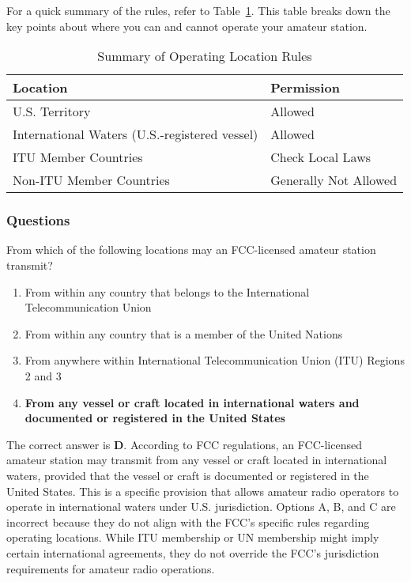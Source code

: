 For a quick summary of the rules, refer to Table~\ref{tab:operating-location-summary}. This table breaks down the key points about where you can and cannot operate your amateur station.

\begin{table}[h]
    \centering
    \begin{tabular}{|l|l|}
        \hline
        \textbf{Location} & \textbf{Permission} \\
        \hline
        U.S. Territory & Allowed \\
        International Waters (U.S.-registered vessel) & Allowed \\
        ITU Member Countries & Check Local Laws \\
        Non-ITU Member Countries & Generally Not Allowed \\
        \hline
    \end{tabular}
    \caption{Summary of Operating Location Rules}
    \label{tab:operating-location-summary}
\end{table}

\subsubsection*{Questions}

\begin{tcolorbox}[colback=gray!10!white,colframe=black!75!black,title={T1C06}]
    From which of the following locations may an FCC-licensed amateur station transmit?
    \begin{enumerate}[label=\Alph*),noitemsep]
        \item From within any country that belongs to the International Telecommunication Union
        \item From within any country that is a member of the United Nations
        \item From anywhere within International Telecommunication Union (ITU) Regions 2 and 3
        \item \textbf{From any vessel or craft located in international waters and documented or registered in the United States}
    \end{enumerate}
\end{tcolorbox}

The correct answer is \textbf{D}. According to FCC regulations, an FCC-licensed amateur station may transmit from any vessel or craft located in international waters, provided that the vessel or craft is documented or registered in the United States. This is a specific provision that allows amateur radio operators to operate in international waters under U.S. jurisdiction. Options A, B, and C are incorrect because they do not align with the FCC's specific rules regarding operating locations. While ITU membership or UN membership might imply certain international agreements, they do not override the FCC's jurisdiction requirements for amateur radio operations.

